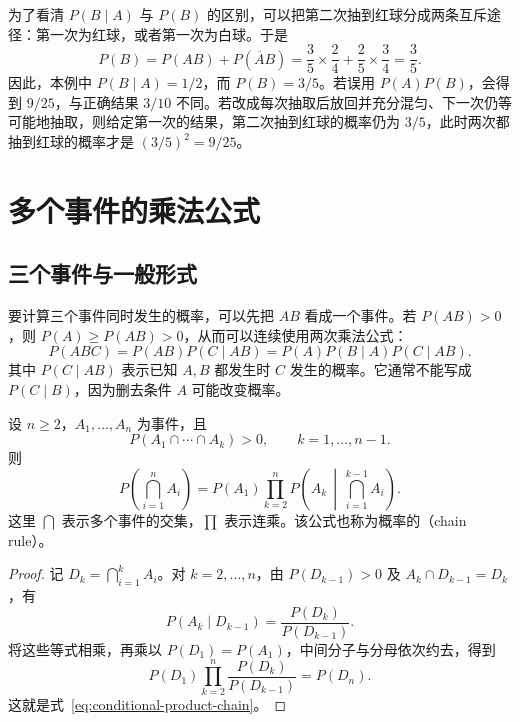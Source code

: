 \documentclass[UTF8]{ctexart}
\begin{document}
为了看清 $P(B\mid A)$ 与 $P(B)$ 的区别，可以把第二次抽到红球分成两条互斥途径：第一次为红球，或者第一次为白球。于是
\[
  P(B)=P(AB)+P(\overline A B)
      =\frac35\times\frac24+\frac25\times\frac34
      =\frac35.
\]
因此，本例中 $P(B\mid A)=1/2$，而 $P(B)=3/5$。若误用 $P(A)P(B)$，会得到 $9/25$，与正确结果 $3/10$ 不同。若改成每次抽取后放回并充分混匀、下一次仍等可能地抽取，则给定第一次的结果，第二次抽到红球的概率仍为 $3/5$，此时两次都抽到红球的概率才是 $(3/5)^2=9/25$。

\section{多个事件的乘法公式}
\label{sec:conditional-product-chain}

\subsection{三个事件与一般形式}

要计算三个事件同时发生的概率，可以先把 $AB$ 看成一个事件。若 $P(AB)>0$，则 $P(A)\ge P(AB)>0$，从而可以连续使用两次乘法公式：
\begin{equation}
  P(ABC)=P(AB)P(C\mid AB)
        =P(A)P(B\mid A)P(C\mid AB).
  \label{eq:conditional-product-three}
\end{equation}
其中 $P(C\mid AB)$ 表示已知 $A,B$ 都发生时 $C$ 发生的概率。它通常不能写成 $P(C\mid B)$，因为删去条件 $A$ 可能改变概率。

\begin{theorem}[多个事件的乘法公式]
\label{thm:conditional-product-chain}
设 $n\ge2$，$A_1,\ldots,A_n$ 为事件，且
\[
  P(A_1\cap\cdots\cap A_k)>0,
  \qquad k=1,\ldots,n-1.
\]
则
\begin{equation}
  P\!\left(\bigcap_{i=1}^{n}A_i\right)
  =P(A_1)\prod_{k=2}^{n}
    P\!\left(A_k\,\middle|\,\bigcap_{i=1}^{k-1}A_i\right).
  \label{eq:conditional-product-chain}
\end{equation}
这里 $\bigcap$ 表示多个事件的交集，$\prod$ 表示连乘。该公式也称为概率的（chain rule）。
\end{theorem}
\begin{proof}
记 $D_k=\bigcap_{i=1}^{k}A_i$。对 $k=2,\ldots,n$，由 $P(D_{k-1})>0$ 及 $A_k\cap D_{k-1}=D_k$，有
\[
  P(A_k\mid D_{k-1})=\frac{P(D_k)}{P(D_{k-1})}.
\]
将这些等式相乘，再乘以 $P(D_1)=P(A_1)$，中间分子与分母依次约去，得到
\[
  P(D_1)\prod_{k=2}^{n}\frac{P(D_k)}{P(D_{k-1})}
  =P(D_n).
\]
这就是式~\eqref{eq:conditional-product-chain}。
\end{proof}
\end{document}
